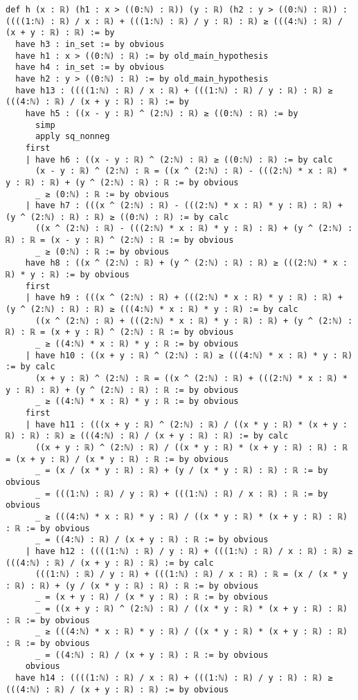\documentclass{article}
\begin{document}
\begin{tcolorbox}[colback=white!10, width=\linewidth]
\begin{lstlisting}[language=Lean4]
def h (x : ℝ) (h1 : x > ((0:ℕ) : ℝ)) (y : ℝ) (h2 : y > ((0:ℕ) : ℝ)) : ((((1:ℕ) : ℝ) / x : ℝ) + (((1:ℕ) : ℝ) / y : ℝ) : ℝ) ≥ (((4:ℕ) : ℝ) / (x + y : ℝ) : ℝ) := by
  have h3 : in_set := by obvious
  have h1 : x > ((0:ℕ) : ℝ) := by old_main_hypothesis
  have h4 : in_set := by obvious
  have h2 : y > ((0:ℕ) : ℝ) := by old_main_hypothesis
  have h13 : ((((1:ℕ) : ℝ) / x : ℝ) + (((1:ℕ) : ℝ) / y : ℝ) : ℝ) ≥ (((4:ℕ) : ℝ) / (x + y : ℝ) : ℝ) := by
    have h5 : ((x - y : ℝ) ^ (2:ℕ) : ℝ) ≥ ((0:ℕ) : ℝ) := by
      simp
      apply sq_nonneg
    first
    | have h6 : ((x - y : ℝ) ^ (2:ℕ) : ℝ) ≥ ((0:ℕ) : ℝ) := by calc
      (x - y : ℝ) ^ (2:ℕ) : ℝ = ((x ^ (2:ℕ) : ℝ) - (((2:ℕ) * x : ℝ) * y : ℝ) : ℝ) + (y ^ (2:ℕ) : ℝ) : ℝ := by obvious
      _ ≥ (0:ℕ) : ℝ := by obvious
    | have h7 : (((x ^ (2:ℕ) : ℝ) - (((2:ℕ) * x : ℝ) * y : ℝ) : ℝ) + (y ^ (2:ℕ) : ℝ) : ℝ) ≥ ((0:ℕ) : ℝ) := by calc
      ((x ^ (2:ℕ) : ℝ) - (((2:ℕ) * x : ℝ) * y : ℝ) : ℝ) + (y ^ (2:ℕ) : ℝ) : ℝ = (x - y : ℝ) ^ (2:ℕ) : ℝ := by obvious
      _ ≥ (0:ℕ) : ℝ := by obvious
    have h8 : ((x ^ (2:ℕ) : ℝ) + (y ^ (2:ℕ) : ℝ) : ℝ) ≥ (((2:ℕ) * x : ℝ) * y : ℝ) := by obvious
    first
    | have h9 : (((x ^ (2:ℕ) : ℝ) + (((2:ℕ) * x : ℝ) * y : ℝ) : ℝ) + (y ^ (2:ℕ) : ℝ) : ℝ) ≥ (((4:ℕ) * x : ℝ) * y : ℝ) := by calc
      ((x ^ (2:ℕ) : ℝ) + (((2:ℕ) * x : ℝ) * y : ℝ) : ℝ) + (y ^ (2:ℕ) : ℝ) : ℝ = (x + y : ℝ) ^ (2:ℕ) : ℝ := by obvious
      _ ≥ ((4:ℕ) * x : ℝ) * y : ℝ := by obvious
    | have h10 : ((x + y : ℝ) ^ (2:ℕ) : ℝ) ≥ (((4:ℕ) * x : ℝ) * y : ℝ) := by calc
      (x + y : ℝ) ^ (2:ℕ) : ℝ = ((x ^ (2:ℕ) : ℝ) + (((2:ℕ) * x : ℝ) * y : ℝ) : ℝ) + (y ^ (2:ℕ) : ℝ) : ℝ := by obvious
      _ ≥ ((4:ℕ) * x : ℝ) * y : ℝ := by obvious
    first
    | have h11 : (((x + y : ℝ) ^ (2:ℕ) : ℝ) / ((x * y : ℝ) * (x + y : ℝ) : ℝ) : ℝ) ≥ (((4:ℕ) : ℝ) / (x + y : ℝ) : ℝ) := by calc
      ((x + y : ℝ) ^ (2:ℕ) : ℝ) / ((x * y : ℝ) * (x + y : ℝ) : ℝ) : ℝ = (x + y : ℝ) / (x * y : ℝ) : ℝ := by obvious
      _ = (x / (x * y : ℝ) : ℝ) + (y / (x * y : ℝ) : ℝ) : ℝ := by obvious
      _ = (((1:ℕ) : ℝ) / y : ℝ) + (((1:ℕ) : ℝ) / x : ℝ) : ℝ := by obvious
      _ ≥ (((4:ℕ) * x : ℝ) * y : ℝ) / ((x * y : ℝ) * (x + y : ℝ) : ℝ) : ℝ := by obvious
      _ = ((4:ℕ) : ℝ) / (x + y : ℝ) : ℝ := by obvious
    | have h12 : ((((1:ℕ) : ℝ) / y : ℝ) + (((1:ℕ) : ℝ) / x : ℝ) : ℝ) ≥ (((4:ℕ) : ℝ) / (x + y : ℝ) : ℝ) := by calc
      (((1:ℕ) : ℝ) / y : ℝ) + (((1:ℕ) : ℝ) / x : ℝ) : ℝ = (x / (x * y : ℝ) : ℝ) + (y / (x * y : ℝ) : ℝ) : ℝ := by obvious
      _ = (x + y : ℝ) / (x * y : ℝ) : ℝ := by obvious
      _ = ((x + y : ℝ) ^ (2:ℕ) : ℝ) / ((x * y : ℝ) * (x + y : ℝ) : ℝ) : ℝ := by obvious
      _ ≥ (((4:ℕ) * x : ℝ) * y : ℝ) / ((x * y : ℝ) * (x + y : ℝ) : ℝ) : ℝ := by obvious
      _ = ((4:ℕ) : ℝ) / (x + y : ℝ) : ℝ := by obvious
    obvious
  have h14 : ((((1:ℕ) : ℝ) / x : ℝ) + (((1:ℕ) : ℝ) / y : ℝ) : ℝ) ≥ (((4:ℕ) : ℝ) / (x + y : ℝ) : ℝ) := by obvious

\end{lstlisting}
\end{tcolorbox}
\end{document}
